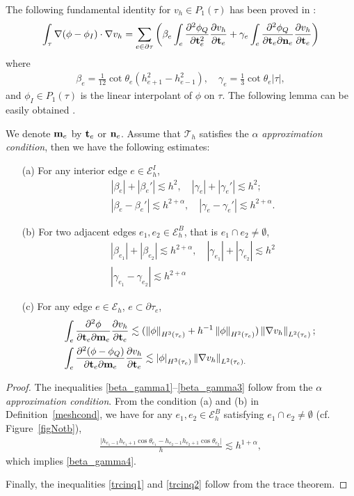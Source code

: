 \documentclass[leqno,final]{siamltex}
\numberwithin{equation}{section}
\newcommand{\norm}[1]{\left\Vert#1\right\Vert}
\newcommand{\abs}[1]{\left\vert#1\right\vert}
\newcommand{\ls}{\lesssim}
\newcommand{\al}{\alpha}
\newcommand{\be}{\beta}
\newcommand{\ga}{\gamma}
\newcommand{\na}{\nabla}
\newcommand{\pa}{\partial}
\newcommand{\ta}{\theta}
\newcommand{\bt}{{\rm\mathbf t}}
\newcommand{\bn}{{\rm\mathbf n}}
\newcommand{\bm}{{\rm\mathbf m}}
\newcommand{\T}{\mathcal{T}}
\newcommand{\E}{\mathcal{E}}
\newcommand{\eq}[1]{\begin{align}#1\end{align}}
\newcommand{\eqn}[1]{\begin{align*}#1\end{align*}}
\begin{document}
The following fundamental identity for $v_h\in P_1(\tau)$ has been proved in \cite{cx07}:
\eq{ \int_\tau \na(\phi-\phi_I)\cdot\na v_h = \sum_{e\in\pa\tau} \bigg( \be_e\int_e\frac{\pa^2\phi_Q}{\pa \bt_e^2}\frac{\pa v_h}{\pa \bt_e} + \ga_e\int_e\frac{\pa^2\phi_Q}{\pa \bt_e\pa \bn_e}\frac{\pa v_h}{\pa \bt_e} \bigg) \label{fdmtliequ} }
where
\eq{ \be_e=\frac{1}{12}\cot\ta_e(h_{e+1}^2-h_{e-1}^2),\quad \ga_e=\frac{1}{3}\cot\ta_e\abs{\tau}, }
and $\phi_I\in P_1(\tau)$ is the linear interpolant of $\phi$ on $\tau$. The following lemma can be easily
obtained \cite{cx07,wz07}.
\begin{lemma} \label{parsestm}
We denote $\bm_e$ by $\bt_e$ or $\bn_e$. Assume that $\T_h$ satisfies the \emph{$\al$ approximation condition}, then
we have the following estimates:
\begin{itemize}
  \item[(a)] For any interior edge $e\in\E_h^I$,
  \eq{ &\abs{\be_e}+\abs{\be_e'}\ls h^2,\quad \abs{\ga_e}+\abs{\ga_e'}\ls h^{2};\label{beta_gamma1}\\
  &\abs{\be_e-\be_e'}\ls h^{2+\al},\quad \abs{\ga_e-\ga_e'}\ls h^{2+\al}.\label{beta_gamma2}}
  \item[(b)] For two adjacent edges $e_1,e_2\in\E_h^B$, that is $e_1\cap e_2\neq\emptyset$,
  \eq{ &\abs{\be_{e_1}}+\abs{\be_{e_2}}\ls h^{2+\al},\quad \abs{\ga_{e_1}}+\abs{\ga_{e_2}}\ls h^{2}\label{beta_gamma3}\\
  & \abs{\ga_{e_1}-\ga_{e_2}}\ls h^{2+\al}\label{beta_gamma4}}
  \item[(c)] For any edge $e\in\E_h$, $e\subset\pa\tau_e$,
  \eq{  &\int_e \frac{\pa^2\phi}{\pa \bt_e\pa \bm_e}\frac{\pa v_h}{\pa \bt_e} \ls (\norm{\phi}_{H^{3}(\tau_e)}+h^{-1}\norm{\phi}_{H^{2}(\tau_e)})\norm{\na v_h}_{L^2(\tau_e)};\label{trcinq1}\\
  &\int_e \frac{\pa^2(\phi-\phi_Q)}{\pa \bt_e\pa \bm_e}\frac{\pa v_h}{\pa \bt_e} \ls \abs{\phi}_{H^{3}(\tau_e)}\norm{\na v_h}_{L^2(\tau_e).\label{trcinq2}}
}
\end{itemize}
\end{lemma}
\begin{proof}
The inequalities \eqref{beta_gamma1}--\eqref{beta_gamma3} follow from the \emph{$\al$ approximation condition}. From the condition (a) and (b) in Definition~\ref{meshcond}, we have
for any $e_1, e_2\in\E_h^B$ satisfying $e_1\cap e_2\neq\emptyset$ (cf. Figure~\ref{figNotb}),
\eqn{ \frac{\big|h_{e_1-1}h_{e_1+1}\cos\ta_{e_1}-h_{e_2-1}h_{e_2+1}\cos\ta_{e_2}\big|}{h} \ls h^{1+\al}, }
which implies \eqref{beta_gamma4}.

Finally, the inequalities \eqref{trcinq1} and \eqref{trcinq2} follow from the trace theorem.
\end{proof}
\end{document}
